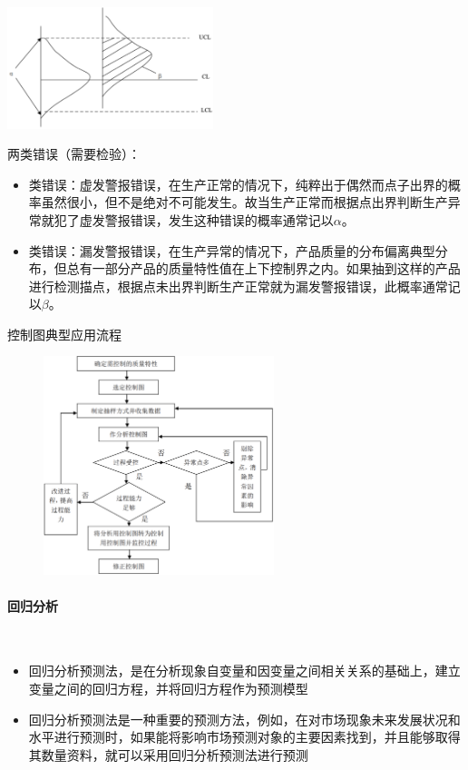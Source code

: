 \begin{table}
    \centering
    \vspace{-2em}
    \includegraphics[width=0.45\textwidth]{images/两类错误.png}
    \vspace{-4.5em}
\end{table}
两类错误（需要检验）：
\begin{itemize}
    \item \uppercase\expandafter{}类错误：虚发警报错误，在生产正常的情况下，纯粹出于偶然而点子出界的概率虽然很小，但不是绝对不可能发生。故当生产正常而根据点出界判断生产异常就犯了虚发警报错误，发生这种错误的概率通常记以$\alpha$。
    \item \uppercase\expandafter{}类错误：漏发警报错误，在生产异常的情况下，产品质量的分布偏离典型分布，但总有一部分产品的质量特性值在上下控制界之内。如果抽到这样的产品进行检测描点，根据点未出界判断生产正常就为漏发警报错误，此概率通常记以$\beta$。
\end{itemize}

控制图典型应用流程
\begin{figure}[H]
    \vspace{-0.5em}
	\centering
	\includegraphics[width=0.6\textwidth]{images/控制图典型应用流程.png}
    \vspace{-1em}
\end{figure}

\paragraph{回归分析}~{} \par
\begin{itemize}
    \item 回归分析预测法，是在分析现象自变量和因变量之间相关关系的基础上，建立变量之间的回归方程，并将回归方程作为预测模型
    \item 回归分析预测法是一种重要的预测方法，例如，在对市场现象未来发展状况和水平进行预测时，如果能将影响市场预测对象的主要因素找到，并且能够取得其数量资料，就可以采用回归分析预测法进行预测
\end{itemize}

